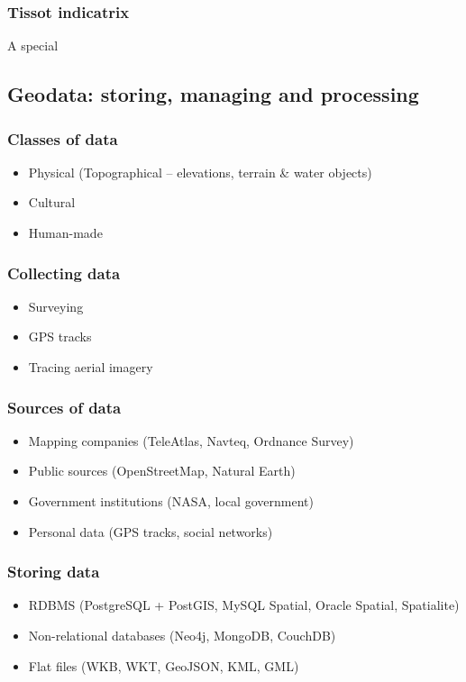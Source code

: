 \documentclass{beamer}
\begin{document}
\begin{frame}
  \frametitle{Tissot indicatrix}
  A special
\end{frame}

\subsection{Geodata: storing, managing and processing }

\begin{frame}
  \frametitle{Classes of data}
  \begin{itemize}
  \item Physical (Topographical -- elevations, terrain \& water objects)
  \item Cultural
  \item Human-made
  \end{itemize}
\end{frame}

\begin{frame}
  \frametitle{Collecting data}
  \begin{itemize}
  \item Surveying
  \item GPS tracks
  \item Tracing aerial imagery
  \end{itemize}
\end{frame}

\begin{frame}
  \frametitle{Sources of data}
  \begin{itemize}
  \item Mapping companies (TeleAtlas, Navteq, Ordnance Survey)
  \item Public sources (OpenStreetMap, Natural Earth)
  \item Government institutions (NASA, local government)
  \item Personal data (GPS tracks, social networks)
  \end{itemize}
\end{frame}

\begin{frame}
  \frametitle{Storing data}
  \begin{itemize}
  \item RDBMS (PostgreSQL + PostGIS, MySQL Spatial, Oracle Spatial, Spatialite)
  \item Non-relational databases (Neo4j, MongoDB, CouchDB)
  \item Flat files (WKB, WKT, GeoJSON, KML, GML)
  \end{itemize}
\end{frame}
\end{document}
